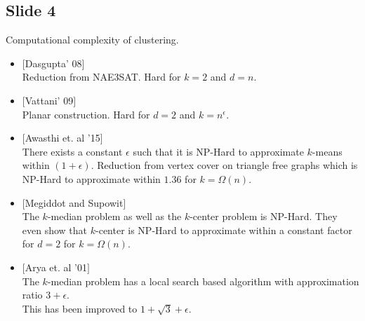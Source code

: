 \documentclass[12pt]{article}
\begin{document}
\subsection*{Slide 4}
Computational complexity of clustering.
	\begin{itemize}
		\item $[$Dasgupta' 08$]$\\
		Reduction from NAE3SAT. Hard for $k=2$ and $d = n$.

		\item $[$Vattani' 09$]$\\
		Planar construction. Hard for $d=2$ and $k=n^{\epsilon}$.

		\item $[$Awasthi et. al '15$]$\\
		There exists a constant $\epsilon$ such that it is NP-Hard to approximate $k$-means within $(1+\epsilon)$. Reduction from  vertex cover on triangle free graphs which is NP-Hard to approximate within $1.36$ for $k = \Omega(n)$.

		\item $[$Megiddot and Supowit$]$\\
		The $k$-median problem as well as the $k$-center problem is NP-Hard. They even show that $k$-center is NP-Hard to approximate within a constant factor for $d = 2$ for $k =\Omega(n)$.

		\item $[$Arya et. al '01$]$\\
		The $k$-median problem has a local search based algorithm with approximation ratio $3+\epsilon$.\\
	This has been improved to $1+\sqrt{3}+\epsilon$.
	\end{itemize}
\end{document}
